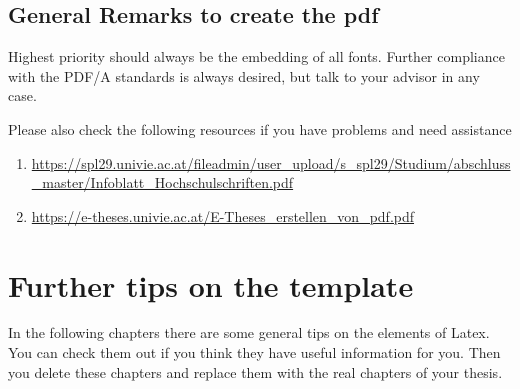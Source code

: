 	\subsection{General Remarks to create the pdf}
	Highest priority should always be the embedding of all fonts. Further compliance with the PDF/A standards is always desired, but talk to your advisor in any case.
	
	Please also check the following resources if you have problems and need assistance
	
	\begin{enumerate}
		\item \url{https://spl29.univie.ac.at/fileadmin/user_upload/s_spl29/Studium/abschluss_master/Infoblatt_Hochschulschriften.pdf} 
		\item \url{https://e-theses.univie.ac.at/E-Theses_erstellen_von_pdf.pdf}
	\end{enumerate}
	
	\section{Further tips on the template}
	In the following chapters there are some general tips on the elements of Latex. You can check them out if you think they have useful information for you. Then you delete these chapters and replace them with the real chapters of your thesis.
